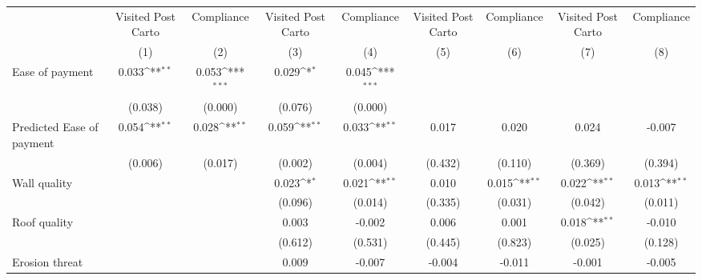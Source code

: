 {
\def\sym#1{\ifmmode^{#1}\else\(^{#1}\)\fi}
\begin{tabular}{l*{8}{c}}
\toprule
                &\multicolumn{1}{c}{Visited Post Carto}&\multicolumn{1}{c}{Compliance}&\multicolumn{1}{c}{Visited Post Carto}&\multicolumn{1}{c}{Compliance}&\multicolumn{1}{c}{Visited Post Carto}&\multicolumn{1}{c}{Compliance}&\multicolumn{1}{c}{Visited Post Carto}&\multicolumn{1}{c}{Compliance}\\
                &\multicolumn{1}{c}{(1)}         &\multicolumn{1}{c}{(2)}         &\multicolumn{1}{c}{(3)}         &\multicolumn{1}{c}{(4)}         &\multicolumn{1}{c}{(5)}         &\multicolumn{1}{c}{(6)}         &\multicolumn{1}{c}{(7)}         &\multicolumn{1}{c}{(8)}         \\
\midrule
Ease of payment &    0.033\sym{**} &    0.053\sym{***}&    0.029\sym{*}  &    0.045\sym{***}&                  &                  &                  &                  \\
                &  (0.038)         &  (0.000)         &  (0.076)         &  (0.000)         &                  &                  &                  &                  \\
Predicted Ease of payment&    0.054\sym{**} &    0.028\sym{**} &    0.059\sym{**} &    0.033\sym{**} &    0.017         &    0.020         &    0.024         &   -0.007         \\
                &  (0.006)         &  (0.017)         &  (0.002)         &  (0.004)         &  (0.432)         &  (0.110)         &  (0.369)         &  (0.394)         \\
Wall quality    &                  &                  &    0.023\sym{*}  &    0.021\sym{**} &    0.010         &    0.015\sym{**} &    0.022\sym{**} &    0.013\sym{**} \\
                &                  &                  &  (0.096)         &  (0.014)         &  (0.335)         &  (0.031)         &  (0.042)         &  (0.011)         \\
Roof quality    &                  &                  &    0.003         &   -0.002         &    0.006         &    0.001         &    0.018\sym{**} &   -0.010         \\
                &                  &                  &  (0.612)         &  (0.531)         &  (0.445)         &  (0.823)         &  (0.025)         &  (0.128)         \\
Erosion threat  &                  &                  &    0.009         &   -0.007         &   -0.004         &   -0.011         &   -0.001         &   -0.005         \\

\end{tabular}}

